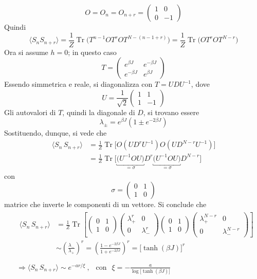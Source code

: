 \documentclass[11pt, a4paper]{scrartcl}
\theoremstyle{style}
\theoremstyle{style1}
\numberwithin{equation}{subsection}
\begin{document}
\[
	O = O_n=O_{n+r}  = \begin{pmatrix} 1 & 0 \\ 0 & -1 \end{pmatrix} 
\] 
Quindi 
\[
\langle S_nS_{n+r}  \rangle = \frac{1}{Z} \operatorname{Tr} \Big(T^{n-1} O T^r O T^{N - (n-1+r)}\Big) = \frac{1}{Z} \operatorname{Tr} \Big(OT^rOT^{N-r}\Big)
\] 
Ora si assume $h=0$; in questo caso
\[
	T = \begin{pmatrix} e^{\beta J} & e^{-\beta J}\\ e^{-\beta J} & e^{\beta J}\end{pmatrix} 
\] 
Essendo simmetrica e reale, si diagonalizza con $T = UDU^{-1}$, dove
\[
	U = \frac{1}{\sqrt{2} } \begin{pmatrix} 1 & 1 \\ 1 & -1 \end{pmatrix} 
\] 
Gli autovalori di $T$, quindi la diagonale di $D$, si trovano essere 
\[
\lambda _{\pm} = e^{\beta J} \left(1 \pm e^{-2\beta J}\right) 
\] 
Sostituendo, dunque, si vede che
\[
\begin{split}
	\langle S_n \, S_{n+r}  \rangle&= \frac{1}{Z}\operatorname{Tr} \Big[O\left(U D^r U ^{-1}\right) O \left(UD^{N-r}U^{-1}\right)  \Big]\\
				       &=\frac{1}{Z}\operatorname{Tr} \Big[\underbracket{\big(U^{-1}O U\big)}_{=\sigma } D^r \underbracket{\big(U^{-1}O U\big)}_{=\sigma } D^{N-r}\Big]
\end{split}
\] 
con 
\[
	\sigma = \begin{pmatrix} 0 & 1 \\ 1 & 0 \end{pmatrix} 
\] 
matrice che inverte le componenti di un vettore.
Si conclude che
\[
\begin{split}
	&\begin{split}
		\langle S_n \, S_{n+r}  \rangle &= \frac{1}{Z} \operatorname{Tr} \left[ \begin{pmatrix} 0& 1\\ 1&0 \end{pmatrix} \begin{pmatrix} \lambda _+^r &0\\ 0 & \lambda _-^r \end{pmatrix} \begin{pmatrix} 0& 1 \\ 1 &0 \end{pmatrix} \begin{pmatrix} \lambda _+^{N-r} & 0 \\ 0 & \lambda _-^{N-r} \end{pmatrix}  \right] \\
						&\sim \left(\frac{\lambda _-}{\lambda _+}\right) ^r = \left(\frac{1- e^{-2\beta J}}{1 + e ^{-2\beta J}}\right) ^r = \big[\tanh (\beta J)\big]^r
	\end{split}\\
	\\
	&\Rightarrow \langle S_n \, S_{n+r}  \rangle \sim e^{-ar / \xi }\ , \ \ \text{ con } \ \, \xi = - \frac{a}{\log\big[ \tanh(\beta J) \big] }
\end{split}
\] 
\end{document}

